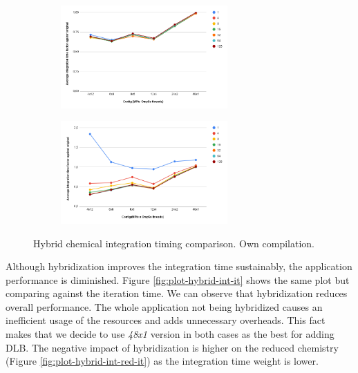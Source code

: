 \begin{figure}[ht]
  \begin{subfigure}{1\textwidth}
    \centering
    \includegraphics[width=0.7\textwidth]{graphics/hybridcomplete.png}
    \label{fig:plot-hybrid-int-det}

  \end{subfigure}
  \begin{subfigure}{1\textwidth}
    \centering
    \includegraphics[width=0.7\textwidth]{graphics/hybridreduced.png}
    \label{fig:plot-hybrid-int-red}

  \end{subfigure}

  \caption[Hybrid chemical integration timing comparison.]{Hybrid chemical integration timing comparison. Own compilation.}
  \label{fig:plot-hybrid-int}
\end{figure}

Although hybridization improves the integration time sustainably, the application performance is diminished. 
Figure \ref{fig:plot-hybrid-int-it} shows the same plot but comparing against the iteration time. We can observe that hybridization reduces overall performance. The whole application not being hybridized causes an inefficient usage of the resources and adds unnecessary overheads. This fact makes that we decide to use \textit{48x1} version in both cases as the best for adding DLB. The negative impact of hybridization is higher on the reduced chemistry (Figure \ref{fig:plot-hybrid-int-red-it}) as the integration time weight is lower.

